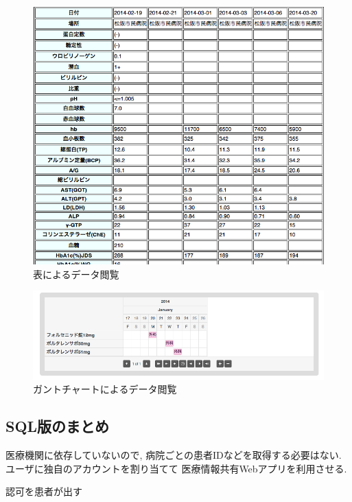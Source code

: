     \begin{figure}[htbp]
        \includegraphics[width=15cm, bb=0 0 698 621]{./gazou/DjangoTable2.png}
      \caption{表によるデータ閲覧}
      \label{DjangoTable}
    \end{figure}

    \begin{figure}[htbp]
        \includegraphics[width=15cm, bb=0 0 835 221]{./gazou/DjangoGantt2.png}
      \caption{ガントチャートによるデータ閲覧}
      \label{DjangoGantt}
    \end{figure}



\subsection{SQL版のまとめ}
  医療機関に依存していないので,
  病院ごとの患者IDなどを取得する必要はない.
  ユーザに独自のアカウントを割り当てて
  医療情報共有Webアプリを利用させる.

  認可を患者が出す


